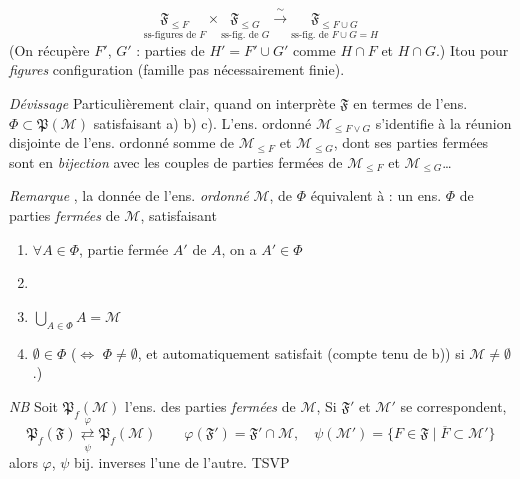 \documentclass[11pt,a4paper]{article}
\begin{document}
\[
  \underset{\text{ss-figures de } F}{\mathfrak{F}_{\leq F}} \times \underset{\text{ss-fig. de } G}{\mathfrak{F}_{\leq G}}
  \xrightarrow{\ \sim\ }
  \underset{\text{ss-fig. de } F \cup G = H}{\mathfrak{F}_{\leq F \cup G}}
\]
(On récupère $F'$, $G'$ : parties de $H' = F' \cup G'$ comme $H \cap F$ et $H \cap G$.) Itou pour  \emph{figures}   configuration (famille pas nécessairement finie). 

\emph{Dévissage} \quad Particulièrement clair, quand on interprète $\mathfrak{F}$ en termes de l'ens. $\Phi \subset \mathfrak{P}(\mathcal{M})$ satisfaisant a) b) c). L'ens. ordonné $\mathcal{M}_{\leq F \vee G}$ s'identifie à la réunion disjointe de l'ens. ordonné somme de $\mathcal{M}_{\leq F}$ et $\mathcal{M}_{\leq G}$, dont ses parties fermées sont \ill{} en \emph{bijection} avec les couples de parties fermées de $\mathcal{M}_{\leq F}$ et $\mathcal{M}_{\leq G}$\ldots

\emph{Remarque} \quad {}, la donnée de l'ens. \emph{ordonné} $\mathcal{M}$,  de $\Phi$ équivalent à : un ens. $\Phi$ de parties \emph{fermées} de $\mathcal{M}$, satisfaisant
\begin{enumerate}
  \item[a)] $\forall A \in \Phi$, \struck{\ill{}}  partie fermée $A'$ de $A$, on a $A' \in \Phi$
  \item[\struck{b)}] 
  \item[b)] $\bigcup_{A \in \Phi} A = \mathcal{M}$ 
  \item[c)] $\emptyset \in \Phi$ \quad ($\Longleftrightarrow$  $\Phi \neq \emptyset$, et automatiquement satisfait (compte tenu de b)) si $\mathcal{M} \neq \emptyset$.)
\end{enumerate}

\emph{NB} Soit $\mathfrak{P}_f(\mathcal{M})$ l'ens. des parties \emph{fermées} de $\mathcal{M}$,  Si $\mathfrak{F}'$ et $\mathcal{M}'$ se correspondent,
\[
  \boxed{\mathfrak{P}_f(\mathfrak{F}) \underset{\psi}{\overset{\varphi}{\rightleftarrows}} \mathfrak{P}_f(\mathcal{M})}
  \qquad
  \varphi(\mathfrak{F}') = \mathfrak{F}' \cap \mathcal{M} , \quad
  \psi(\mathcal{M}') = \lbrace F \in \mathfrak{F} \mid \overline{F} \subset \mathcal{M}' \rbrace
\]
alors $\varphi$, $\psi$ bij. inverses l'une de l'autre. TSVP
\end{document}
